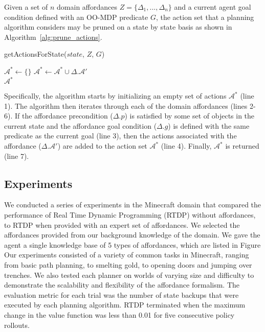 \documentclass[conference]{IEEEtran}
\begin{document}
Given a set of $n$ domain affordances $Z = \{\Delta_1, ..., \Delta_n\}$ and a current agent goal condition defined with an OO-MDP predicate $G$, the action set that a planning algorithm considers may be pruned on a state by state basis as shown in Algorithm~\ref{alg:prune_actions}.
\begin{algorithm}
  \caption{getActionsForState($state$, $Z$, $G$)}
  \begin{algorithmic}[1]
    \State $\mathcal{A}^* \leftarrow \{\}$
    \State $\mathcal{A}^* \leftarrow \mathcal{A}^* \cup \Delta.\mathcal{A}'$
    \EndIf
    \EndFor \\
    \Return $\mathcal{A}^*$
  \end{algorithmic}
  \label{alg:prune_actions}
\end{algorithm}

Specifically, the algorithm starts
by initializing an empty set of actions $\mathcal{A}^*$ (line 1). The algorithm then iterates
through each of the domain affordances (lines 2-6). If the affordance
precondition ($\Delta.p$) is satisfied by some set of objects in the current state
and the affordance goal condition ($\Delta.g$) is defined with the same predicate
as the current goal (line 3), then the actions associated with the affordance ($\Delta.\mathcal{A}'$) are added to the action set $\mathcal{A}^*$ (line 4). Finally, $\mathcal{A}^*$ is returned (line 7). 

\subsection{Experiments}

We conducted a series of experiments in the Minecraft domain that
compared the performance of Real Time Dynamic Programming (RTDP) without affordances,
to RTDP when provided with an expert set of affordances. We selected the
affordances provided from our background knowledge of the domain.  
We gave the agent a single knowledge base of 5 types of affordances, which are listed in Figure %
Our experiments consisted of a variety of common tasks in Minecraft, ranging from basic path planning, to smelting gold,
to opening doors and jumping over trenches.  We also tested each
planner on worlds of varying size and difficulty to demonstrate the
scalability and flexibility of the affordance formalism. The
evaluation metric for each trial was the number of state backups that
were executed by each planning algorithm. RTDP terminated when the maximum change in the
value function was less than 0.01 for five consecutive policy
rollouts.
\end{document}
